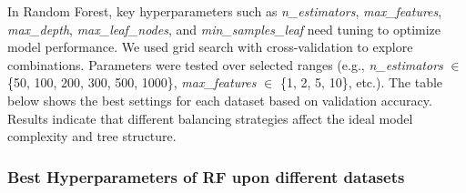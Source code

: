 \begin{frame}

    In Random Forest, key hyperparameters such as \textit{n\_estimators}, \textit{max\_features}, \textit{max\_depth}, \textit{max\_leaf\_nodes}, and \textit{min\_samples\_leaf} need tuning to optimize model performance. 
    We used grid search with cross-validation to explore combinations. Parameters were tested over selected ranges (e.g., \textit{n\_estimators} $\in$ \{50, 100, 200, 300, 500, 1000\}, \textit{max\_features} $\in$ \{1, 2, 5, 10\}, etc.). 
    The table below shows the best settings for each dataset based on validation accuracy. 
    Results indicate that different balancing strategies affect the ideal model complexity and tree structure.    

    \frametitle{Best Hyperparameters of RF upon different datasets}
    \begin{table}[ht]
        \centering
        \label{tab:rf-hyperparameters}
    \end{table}
\end{frame}
